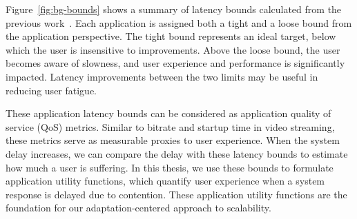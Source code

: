 Figure~\ref{fig:bg-bounds} shows a summary of latency bounds calculated from the
previous work~\cite{chen2017empirical}. Each application is assigned both a
tight and a loose bound from the application perspective. The tight bound
represents an ideal target, below which the user is insensitive to improvements.
Above the loose bound, the user becomes aware of slowness, and user experience
and performance is significantly impacted. Latency improvements between the two
limits may be useful in reducing user fatigue.

These application latency bounds can be considered as application quality of
service (QoS) metrics. Similar to bitrate and startup time in video streaming,
these metrics serve as measurable proxies to user experience. When the system
delay increases, we can compare the delay with these latency bounds to estimate
how much a user is suffering. In this thesis, we use these bounds to formulate
application utility functions, which quantify user experience when a system
response is delayed due to contention. These application utility functions are
the foundation for our adaptation-centered approach to scalability.



